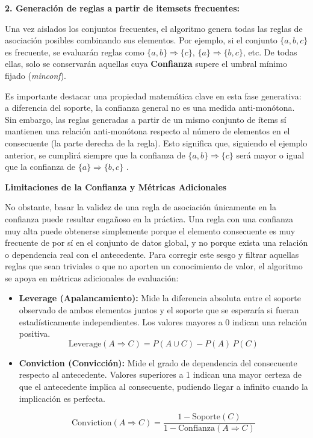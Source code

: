 \documentclass[twoside,a4paper,12pt,onecolumn,openany]{book}
\begin{document}
\vspace{0.5cm}

\textbf{2. Generación de reglas a partir de itemsets frecuentes:} 

\vspace{0.5cm}

Una vez aislados los conjuntos frecuentes, el algoritmo genera todas las reglas de asociación posibles combinando sus elementos. Por ejemplo, si el conjunto $\{a, b, c\}$ es frecuente, se evaluarán reglas como $\{a, b\} \Rightarrow \{c\}$, $\{a\} \Rightarrow \{b, c\}$, etc. De todas ellas, solo se conservarán aquellas cuya \textbf{Confianza} supere el umbral mínimo fijado (\textit{minconf}).

\vspace{0.5cm}

Es importante destacar una propiedad matemática clave en esta fase generativa: a diferencia del soporte, la confianza general no es una medida anti-monótona. Sin embargo, las reglas generadas a partir de un mismo conjunto de ítems sí mantienen una relación anti-monótona respecto al número de elementos en el consecuente (la parte derecha de la regla). Esto significa que, siguiendo el ejemplo anterior, se cumplirá siempre que la confianza de $\{a, b\} \Rightarrow \{c\}$ será mayor o igual que la confianza de $\{a\} \Rightarrow \{b, c\}$ \cite{practica_asociacion}.  

\vspace{0.5cm}

\textbf{Limitaciones de la Confianza y Métricas Adicionales} 

\vspace{0.5cm}

No obstante, basar la validez de una regla de asociación únicamente en la confianza puede resultar engañoso en la práctica. Una regla con una confianza muy alta puede obtenerse simplemente porque el elemento consecuente es muy frecuente de por sí en el conjunto de datos global, y no porque exista una relación o dependencia real con el antecedente.  Para corregir este sesgo y filtrar aquellas reglas que sean triviales o que no aporten un conocimiento de valor, el algoritmo se apoya en métricas adicionales de evaluación:  

\begin{itemize}
\item \textbf{Leverage (Apalancamiento):} Mide la diferencia absoluta entre el soporte observado de ambos elementos juntos y el soporte que se esperaría si fueran estadísticamente independientes. Los valores mayores a 0 indican una relación positiva.
$$ \text{Leverage}(A \Rightarrow C) = P(A \cup C) - P(A)\,P(C) $$

\item \textbf{Conviction (Convicción):} Mide el grado de dependencia del consecuente respecto al antecedente. Valores superiores a 1 indican una mayor certeza de que el antecedente implica al consecuente, pudiendo llegar a infinito cuando la implicación es perfecta.

$$ \text{Conviction}(A \Rightarrow C) = \frac{1 - \text{Soporte}(C)}{1 - \text{Confianza}(A \Rightarrow C)} $$

\end{itemize}
\end{document}
